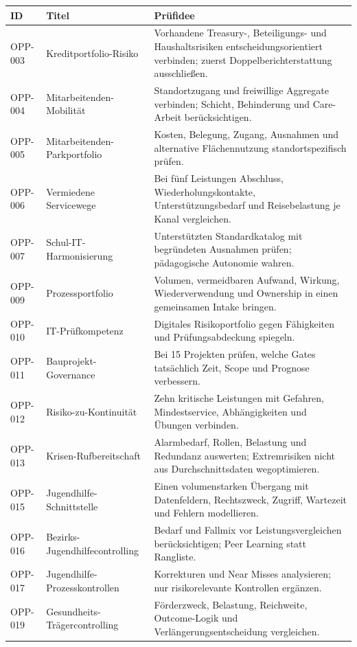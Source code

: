 \documentclass[11pt,a4paper]{article}
\begin{document}
\begin{longtable}{p{1.8cm}p{5.1cm}p{8cm}}
\toprule
\textbf{ID} & \textbf{Titel} & \textbf{Prüfidee} \\
\midrule
OPP-003 & Kreditportfolio-Risiko & Vorhandene Treasury-, Beteiligungs- und Haushaltsrisiken entscheidungsorientiert verbinden; zuerst Doppelberichterstattung ausschließen. \\
OPP-004 & Mitarbeitenden-Mobilität & Standortzugang und freiwillige Aggregate verbinden; Schicht, Behinderung und Care-Arbeit berücksichtigen. \\
OPP-005 & Mitarbeitenden-Parkportfolio & Kosten, Belegung, Zugang, Ausnahmen und alternative Flächennutzung standortspezifisch prüfen. \\
OPP-006 & Vermiedene Servicewege & Bei fünf Leistungen Abschluss, Wiederholungskontakte, Unterstützungsbedarf und Reisebelastung je Kanal vergleichen. \\
OPP-007 & Schul-IT-Harmonisierung & Unterstützten Standardkatalog mit begründeten Ausnahmen prüfen; pädagogische Autonomie wahren. \\
OPP-009 & Prozessportfolio & Volumen, vermeidbaren Aufwand, Wirkung, Wiederverwendung und Ownership in einen gemeinsamen Intake bringen. \\
OPP-010 & IT-Prüfkompetenz & Digitales Risikoportfolio gegen Fähigkeiten und Prüfungsabdeckung spiegeln. \\
OPP-011 & Bauprojekt-Governance & Bei 15 Projekten prüfen, welche Gates tatsächlich Zeit, Scope und Prognose verbessern. \\
OPP-012 & Risiko-zu-Kontinuität & Zehn kritische Leistungen mit Gefahren, Mindestservice, Abhängigkeiten und Übungen verbinden. \\
OPP-013 & Krisen-Rufbereitschaft & Alarmbedarf, Rollen, Belastung und Redundanz auswerten; Extremrisiken nicht aus Durchschnittsdaten wegoptimieren. \\
OPP-015 & Jugendhilfe-Schnittstelle & Einen volumenstarken Übergang mit Datenfeldern, Rechtszweck, Zugriff, Wartezeit und Fehlern modellieren. \\
OPP-016 & Bezirks-Jugendhilfecontrolling & Bedarf und Fallmix vor Leistungsvergleichen berücksichtigen; Peer Learning statt Rangliste. \\
OPP-017 & Jugendhilfe-Prozesskontrollen & Korrekturen und Near Misses analysieren; nur risikorelevante Kontrollen ergänzen. \\
OPP-019 & Gesundheits-Trägercontrolling & Förderzweck, Belastung, Reichweite, Outcome-Logik und Verlängerungsentscheidung vergleichen. \\

\end{longtable}
\end{document}
